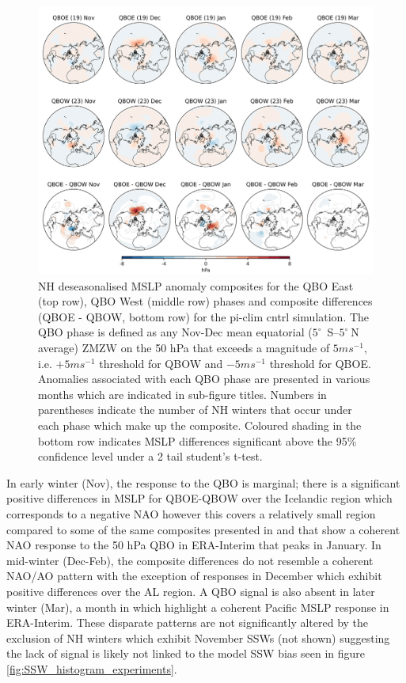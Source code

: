 \begin{figure}[h!]
\begin{center}
\noindent\includegraphics[width =0.8\linewidth]{Figures/Figures-deepQBO/LAGGED_SLP_composites_individual_months_QBO_phases_U_piclim_50hPa_5thresh.png}
\caption[MSLP composites under different QBO phases in the pi-clim cntrl simulation]{NH deseasonalised MSLP anomaly composites for the QBO East (top row), QBO West (middle row) phases and composite differences (QBOE - QBOW, bottom row) for the pi-clim cntrl simulation. The QBO phase is defined as any Nov-Dec mean equatorial ($5^{\circ}$\ S--$5^{\circ}\ $N average) ZMZW on the 50 hPa that exceeds a magnitude of $5 ms^{-1}$, i.e. $+5 ms^{-1}$ threshold for QBOW and $-5 ms^{-1}$ threshold for QBOE. Anomalies associated with each QBO phase are presented in various months which are indicated in sub-figure titles. Numbers in parentheses indicate the number of NH winters that occur under each phase which make up the composite. Coloured shading in the bottom row indicates MSLP differences significant above the 95\% confidence level under a 2 tail student’s t-test.}
\label{fig:SLP_piclim}
\end{center}
\end{figure}

In early winter (Nov), the response to the QBO is marginal; there is a significant positive differences in MSLP for QBOE-QBOW over the Icelandic region which corresponds to a negative NAO however this covers a relatively small region compared to some of the same composites presented in \cite{andrewsObserved2019d} and \cite{graySurface2018b} that show a coherent NAO response to the 50 hPa QBO in ERA-Interim that peaks in January. In mid-winter (Dec-Feb), the composite differences do not resemble a coherent NAO/AO pattern with the exception of responses in December which exhibit positive differences over the AL region. A QBO signal is also absent in later winter (Mar), a month in which \cite{graySurface2018b} highlight a coherent Pacific MSLP response in ERA-Interim. These disparate patterns are not significantly altered by the exclusion of NH winters which exhibit November SSWs (not shown) suggesting the lack of signal is likely not linked to the model SSW bias seen in figure \ref{fig:SSW_histogram_experiments}. 

